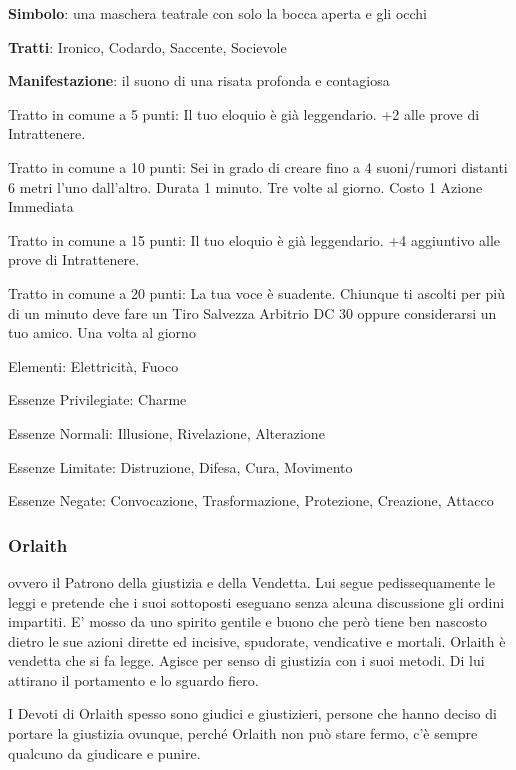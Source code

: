 \documentclass[a4paper,11pt,twoside,openany]{book}
\begin{document}
\textbf{Simbolo}: una maschera teatrale con solo la bocca aperta e
gli occhi

\textbf{Tratti}: Ironico, Codardo, Saccente, Socievole

\textbf{Manifestazione}: il suono di una risata profonda e contagiosa

\bigskip

Tratto in comune a 5 punti: Il tuo eloquio è già leggendario. +2 alle prove di Intrattenere.

Tratto in comune a 10 punti: Sei in grado di creare fino a 4 suoni/rumori distanti 6 metri l'uno dall'altro. Durata 1 minuto. Tre volte al giorno. Costo 1 Azione Immediata

Tratto in comune a 15 punti: Il tuo eloquio è già leggendario. +4 aggiuntivo alle prove di Intrattenere.

Tratto in comune a 20 punti: La tua voce è suadente. Chiunque ti ascolti per più di un minuto deve fare un Tiro Salvezza Arbitrio DC 30 oppure considerarsi un tuo amico. Una volta al giorno

\bigskip

Elementi: Elettricità, Fuoco

\bigskip

Essenze Privilegiate: Charme

Essenze Normali: Illusione, Rivelazione, Alterazione

Essenze Limitate: Distruzione, Difesa, Cura, Movimento

Essenze Negate: Convocazione, Trasformazione, Protezione, Creazione, Attacco

\subsubsection{Orlaith}

\label{orlaith}

ovvero il Patrono della giustizia e della Vendetta. Lui segue pedissequamente le leggi e pretende che i suoi sottoposti eseguano senza alcuna discussione gli ordini impartiti. E' mosso da uno spirito gentile e buono che però tiene ben nascosto dietro le sue azioni dirette ed incisive, spudorate, vendicative e mortali. Orlaith è vendetta che si fa legge. Agisce per senso di giustizia con i suoi metodi. Di lui attirano il portamento e lo sguardo fiero.

I Devoti di Orlaith spesso sono giudici e giustizieri, persone che hanno deciso di portare la giustizia ovunque, perché Orlaith non può stare fermo, c'è sempre qualcuno da giudicare e punire.
\end{document}
